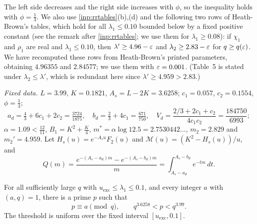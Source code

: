 The left side decreases and the right side increases with $\phi$, so the inequality holds with
$\phi=\frac13$. We also use \cref{inp:rrtables}(b),(d) and the following two rows of Heath-Brown's
tables, which hold for all $\lambda_1\le0.10$ bounded below by a fixed positive constant
\cite[\S8, Table~2 and Table~5]{HeathBrown1992zero} (see the remark after \cref{inp:rrtables}; we use them
for $\lambda_1\ge0.08$): if $\chi_1$ and
$\rho_1$ are real and $\lambda_1\le0.10$, then $\lambda'\ge4.96-\varepsilon$ and $\lambda_2\ge2.83-\varepsilon$ for $q\ge q(\varepsilon)$. We have
recomputed these rows from Heath-Brown's printed parameters, obtaining $4.96355$ and $2.84577$; we use
them with $\varepsilon=0.001$. (Table~5 is stated under $\lambda_2\le\lambda'$, which is redundant here since
$\lambda'\ge4.959>2.83$.)

\emph{Fixed data.} $L=3.99$, $K=0.1821$, $A_s=L-2K=3.6258$; $c_1=0.057$, $c_2=0.1554$, $\phi=\frac13$;
\[
  a_d=\tfrac43+6c_1+2c_2=\tfrac{3724}{1875},\quad b_d=\tfrac23+4c_1=\tfrac{671}{750},\quad
  V_d=\frac{2/3+2c_1+c_2}{4c_1c_2}=\frac{184750}{6993};
\]
$\alpha=1.09<\frac{12}{11}$, $B_1=K^2+\frac K4$, $m^*=\alpha\log12.5=2.7530442\ldots$, $m_2=2.829$ and $m_2'=4.959$.
Let $H_s(u)=e^{-A_su}F_2(u)$ and $\mathcal M(u)=(K^2-H_s(u))/u$, and
\[
  Q(m)=\frac{e^{-(A_s-a_d)m}-e^{-(A_s-b_d)m}}m=\int_{A_s-a_d}^{A_s-b_d}e^{-tm}\,dt .
\]

\begin{theorem}\label{thm:small}
For all sufficiently large $q$ with $u_{\mathrm{exc}}\le\lambda_1\le0.1$, and every
integer $a$ with $(a,q)=1$, there is a prime $p$ such that
\[
  p\equiv a\pmod q,\qquad q^{3.6258}<p<q^{3.99}.
\]
The threshold is uniform over the fixed interval $[u_{\mathrm{exc}},0.1]$.
\end{theorem}

